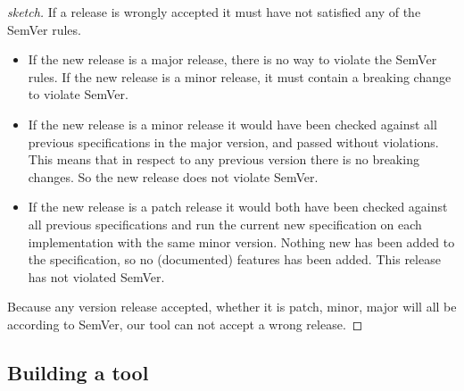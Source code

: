 \begin{proof}[sketch]
If a release is wrongly accepted it must have not satisfied any of the SemVer
rules. 

\begin{itemize}
    \item If the new release is a major release, there is no way to violate the
    SemVer rules. If the new release is a minor release, it must contain a breaking
    change to violate SemVer. 
    \item If the new release is a minor release it would have been checked against all
    previous specifications in the major version, and passed without violations.
    This means that in respect to any previous version there is no breaking
    changes. So the new release does not violate SemVer.\
    \item If the new release is a patch release it would both have been checked against all 
    previous specifications and run the current new specification on each
    implementation with the same minor version. Nothing new has been added to the
    specification, so no (documented) features has been added. This release has not
    violated SemVer.
\end{itemize}

Because any version release accepted, whether it is patch, minor, major will all be according to 
SemVer, our tool can not accept a wrong release.
\end{proof}

\subsection{Building a tool}

